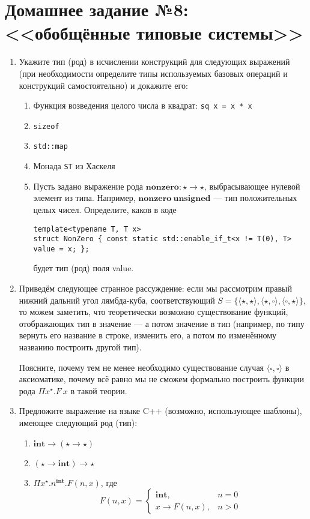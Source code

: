 \documentclass[10pt,a4paper,oneside]{article}
\begin{document}
\section*{Домашнее задание №8: <<обобщённые типовые системы>>}
\begin{enumerate}
\item Укажите тип (род) в исчислении конструкций для следующих выражений (при необходимости определите
типы используемых базовых операций и конструкций самостоятельно) и докажите его:
\begin{enumerate}
\item Функция возведения целого числа в квадрат: \verb!sq x = x * x!
\item \verb!sizeof!
\item \verb!std::map!
\item Монада \verb!ST! из Хаскеля
\item Пусть задано выражение рода $\textbf{nonzero}: \star\rightarrow\star$, выбрасывающее нулевой элемент из
типа. Например, $\textbf{nonzero}\ \textbf{unsigned}$ --- тип положительных целых чисел.
Определите, каков в коде
\begin{verbatim}
template<typename T, T x>
struct NonZero { const static std::enable_if_t<x != T(0), T> value = x; };
\end{verbatim}
будет тип (род) поля value.
\end{enumerate}

\item Приведём следующее странное рассуждение: если мы рассмотрим правый нижний дальний угол лямбда-куба,
соответствующий $S = \{ \langle\star,\star\rangle, \langle\star,\square\rangle, \langle\square,\star\rangle\}$,
то можем заметить, что теоретически возможно существование функций, отображающих тип в значение --- 
а потом значение в тип
(например, по типу вернуть его название в строке, изменить его, а потом по изменённому названию построить другой тип).

Поясните, почему тем не менее необходимо существование случая $\langle\square,\square\rangle$ в аксиоматике,
почему всё равно мы не сможем формально построить функции рода $\Pi x^\star.F\ x$ в такой теории.

\item Предложите выражение на языке C++ (возможно, использующее шаблоны), имеющее следующий род (тип):
\begin{enumerate}
\item $\textbf{int}\rightarrow(\star\rightarrow\star)$
\item $(\star\rightarrow\textbf{int})\rightarrow\star$
\item $\Pi x^\star.n^\textbf{int}.F(n,x)$, где $$F(n,x) = \left\{\begin{array}{ll}\textbf{int}, & n = 0\\
                                   x\rightarrow F(n,x), & n > 0\end{array}\right.$$
\end{enumerate}


\end{enumerate}
\end{document}
